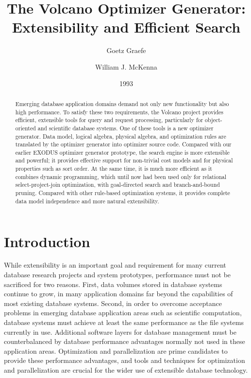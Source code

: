 \documentclass[a4paper,12pt,notitlepage,twoside,openright]{article}
\title{The Volcano Optimizer Generator: Extensibility and Efficient
Search}
\author{Goetz Graefe}
\affil{Portland State University}
\author{William J. McKenna}
\affil{University of Colorado at Boulder}
\date{1993}
\begin{document}
\maketitle

\begin{abstract}

Emerging database application domains demand not only new functionality
but also high performance. To satisfy these two requirements, the
Volcano project provides efficient, extensible tools for query and
request processing, particularly for object-oriented and scientific
database systems. One of these tools is a new optimizer generator. Data
model, logical algebra, physical algebra, and optimization rules are
translated by the optimizer generator into optimizer source code.
Compared with our earlier EXODUS optimizer generator prototype, the
search engine is more extensible and powerful; it provides effective
support for non-trivial cost models and for physical properties such as
sort order. At the same time, it is much more efficient as it combines
dynamic programming, which until now had been used only for relational
select-project-join optimization, with goal-directed search and
branch-and-bound pruning. Compared with other rule-based optimization
systems, it provides complete data model independence and more natural
extensibility.

\end{abstract}

\hypertarget{introduction}{%
\section{Introduction}\label{introduction}}

While extensibility is an important goal and requirement for many
current database research projects and system prototypes, performance
must not be sacrificed for two reasons. First, data volumes stored in
database systems continue to grow, in many application domains far
beyond the capabilities of most existing database systems. Second, in
order to overcome acceptance problems in emerging database application
areas such as scientific computation, database systems must achieve at
least the same performance as the file systems currently in use.
Additional software layers for database management must be
counterbalanced by database performance advantages normally not used in
these application areas. Optimization and parallelization are prime
candidates to provide these performance advantages, and tools and
techniques for optimization and parallelization are crucial for the
wider use of extensible database technology.
\end{document}
